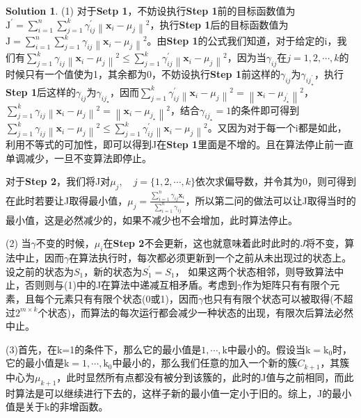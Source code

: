 \documentclass[a4paper,UTF8]{article}
\theoremstyle{definition}
\newtheorem*{solution}{Solution}
\begin{document}
\begin{solution}
	\phantom{此处用于写解答(中英文均可)}
	
(1) 对于\textbf{Setp 1}，不妨设执行\textbf{Step 1}前的目标函数值为$\text{J}^\prime = \sum_{i=1}^{n} \sum_{j=1}^{k} \gamma^\prime_{i j}\left\|\mathbf{x}_{i}-\mu_{j}\right\|^{2}$，执行\textbf{Step 1}后的目标函数值为$\text{J} = \sum_{i=1}^{n} \sum_{j=1}^{k} \gamma_{i j}\left\|\mathbf{x}_{i}-\mu_{j}\right\|^{2}$。由\textbf{Step 1}的公式我们知道，对于给定的i，我们有$\sum_{j=1}^k \gamma_{ij}\left\|\mathbf{x}_{i}-\mu_{j}\right\|^{2}\leqslant \sum_{j=1}^k \gamma^\prime_{ij}\left\|\mathbf{x}_{i}-\mu_{j}\right\|^{2}$，因为当$\gamma_{ij}$在$j = 1, 2,\cdots,k$的时候只有一个值使为1，其余都为0，不妨设执行\textbf{Step 1}前这样的$\gamma_{ij}$为$\gamma_{ij_\star^\prime}$，执行\textbf{Step 1}后这样的$\gamma_{ij}$为$\gamma_{ij_\star}$，因而$\sum_{j=1}^k \gamma^\prime_{ij}\left\|\mathbf{x}_{i}-\mu_{j}\right\|^{2}=\left\|\mathbf{x}_{i}-\mu_{j_\star^\prime}\right\|^{2}$，$\sum_{j=1}^k \gamma_{ij}\left\|\mathbf{x}_{i}-\mu_{j}\right\|^{2}=\left\|\mathbf{x}_{i}-\mu_{j_\star}\right\|^{2}$，结合$\gamma_{ij_\star} = 1$的条件即可得到$\sum_{j=1}^k \gamma_{ij}\left\|\mathbf{x}_{i}-\mu_{j}\right\|^{2}\leqslant \sum_{j=1}^k \gamma^\prime_{ij}\left\|\mathbf{x}_{i}-\mu_{j}\right\|^{2}$。又因为对于每一个i都是如此，利用不等式的可加性，即可以得到J在\textbf{Step 1}里面是不增的。且在算法停止前一直单调减少，一旦不变算法即停止。

对于\textbf{Step 2}，我们将J对$\mu_j,\quad j = \{1,2,\cdots,k\}$依次求偏导数，并令其为0，则可得到在此时若要让J取得最小值，$\mu_{j}=\frac{\sum_{i=1}^{n} \gamma_{i j} \mathbf{x}_{i}}{\sum_{i=1}^{n} \gamma_{i j}}$，所以第二问的做法可以让J取得当时的最小值，这是必然减少的，如果不减少也不会增加，此时算法停止。

(2) 当$\gamma$不变的时候，$\mu_i$在\textbf{Step 2}不会更新，这也就意味着此时此时的$J$将不变，算法中止，因而$\gamma$在算法执行时，每次都必须更新到一个之前从未出现过的状态上。设之前的状态为$S_1$，新的状态为$S_1^\prime=S_1$，
如果这两个状态相邻，则导致算法中止，否则则与(1)中的J在算法中递减互相矛盾。考虑到$\gamma$作为矩阵只有有限个元素，且每个元素只有有限个状态(0或1)，因而$\gamma$也只有有限个状态可以被取得(不超过$2^{m\times k }$个状态)，而算法的每次运行都会减少一种状态的出现，有限次后算法必然中止。

(3)首先，在k=1的条件下，那么它的最小值是$1,\cdots,\text{k}$中最小的。假设当$ \text{k}=\text{k}_0$时，它的最小值是$\text{k}=1,\cdots,\text{k}_0$中最小的，那么我们任意的加入一个新的簇$ C_{k+1}$，其簇中心为$\mu_{k+1}$，此时显然所有点都没有被分到该簇的，此时的J值与之前相同，而此时算法是可以继续进行下去的，这样子新的最小值一定小于旧的。综上，J的最小值是关于k的非增函数。


\end{solution}
\end{document}
